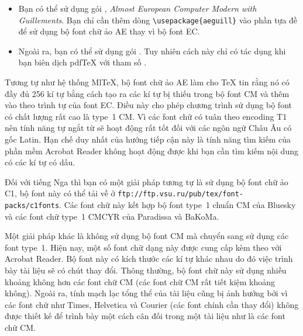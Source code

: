 \begin{itemize}
	\item Bạn có thể sử dụng gói , \emph{Almost European Computer Modern with Guillements}. Bạn chỉ cần thêm dòng \verb+\usepackage{aeguill}+ vào phần tựa đề để sử dụng bộ font chữ ảo AE thay vì bộ font EC.
	\item Ngoài ra, bạn có thể sử dụng gói . Tuy nhiên cách này chỉ có tác dụng khi bạn biên dịch pdf\TeX{} với tham số .
\end{itemize}

Tương tự như hệ thống {Ml\TeX{}}, bộ font chữ ảo AE làm cho \TeX{} tin rằng nó có đầy đủ 256 kí tự bằng cách tạo ra các kí tự bị thiếu trong bộ font CM và thêm vào theo trình tự của font EC. Điều này cho phép chương trình sử dụng bộ font có chất lượng rất cao là type~1 CM. Vì các font chữ có tuân theo encoding T1 nên tính năng tự ngắt từ sẽ hoạt động rất tốt đối với các ngôn ngữ Châu Âu có gốc Latin. Hạn chế duy nhất của hướng tiếp cận này là tính năng tìm kiếm của phần mềm Acrobat Reader không hoạt động được khi bạn cần tìm kiếm nội dung có các kí tự có dấu.

Đối với tiếng Nga thì bạn có một giải pháp tương tự là sử dụng bộ font chữ ảo C1, bộ font này có thể tải về ở \texttt{ftp://ftp.vsu.ru/pub/tex/font-packs/c1fonts}. Các font chữ này kết hợp bộ font type~1 chuẩn CM của Bluesky và các font chữ type~1 CMCYR của Paradissa và BaKoMa.

Một giải pháp khác là không sử dụng bộ font CM mà chuyển sang sử dụng các font \PSi{} type~1. Hiện nay, một số font chữ dạng này được cung cấp kèm theo với Acrobat Reader. Bộ font này có kích thước các kí tự khác nhau do đó việc trình bày tài liệu sẽ có chút thay đổi. Thông thường, bộ font chữ này sử dụng nhiều khoảng không hơn các font chữ CM (các font chữ CM rất tiết kiệm khoảng không). Ngoài ra, tính mạch lạc tổng thể của tài liệu cũng bị ảnh hưởng bởi vì các font chữ như Times, Helvetica và Courier (các font chính cần thay đổi) không được thiết kế để trình bày một cách cân đối trong một tài liệu như là các font chữ CM.

